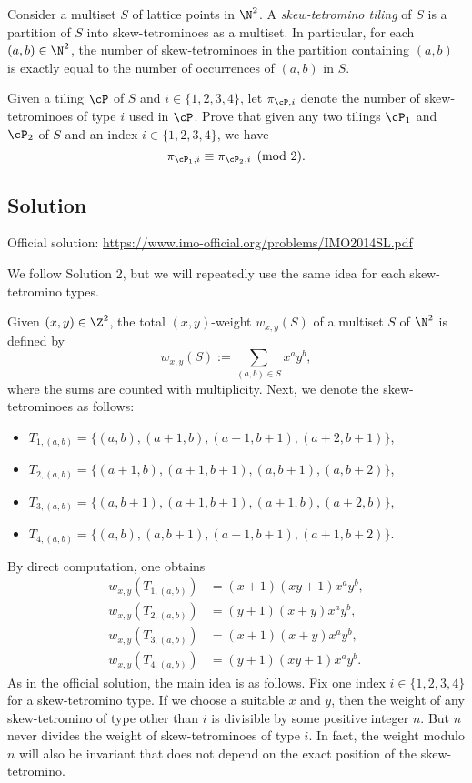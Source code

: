 Consider a multiset $S$ of lattice points in $\N^2$.
A \emph{skew-tetromino tiling} of $S$ is a partition of $S$ into skew-tetrominoes as a multiset.
In particular, for each $(a, b) \in \N^2$, the number of skew-tetrominoes in the partition containing $(a, b)$ is exactly equal to the number of occurrences of $(a, b)$ in $S$.

Given a tiling $\cP$ of $S$ and $i \in \{1, 2, 3, 4\}$, let $\pi_{\cP, i}$ denote the number of skew-tetrominoes of type $i$ used in $\cP$.
Prove that given any two tilings $\cP_1$ and $\cP_2$ of $S$ and an index $i \in \{1, 2, 3, 4\}$, we have
\[ \pi_{\cP_1, i} \equiv \pi_{\cP_2, i} \pmod{2}. \]



\subsection*{Solution}

Official solution: \url{https://www.imo-official.org/problems/IMO2014SL.pdf}

We follow Solution 2, but we will repeatedly use the same idea for each skew-tetromino types.

Given $(x, y) \in \Z^2$, the total $(x, y)$-weight $w_{x, y}(S)$ of a multiset $S$ of $\N^2$ is defined by
\[ w_{x, y}(S) := \sum_{(a, b) \in S} x^a y^b, \]
    where the sums are counted with multiplicity.
Next, we denote the skew-tetrominoes as follows:
\begin{itemize}
    \item   $T_{1, (a, b)} = \{(a, b), (a + 1, b), (a + 1, b + 1), (a + 2, b + 1)\}$,
    \item   $T_{2, (a, b)} = \{(a + 1, b), (a + 1, b + 1), (a, b + 1), (a, b + 2)\}$,
    \item   $T_{3, (a, b)} = \{(a, b + 1), (a + 1, b + 1), (a + 1, b), (a + 2, b)\}$,
    \item   $T_{4, (a, b)} = \{(a, b), (a, b + 1), (a + 1, b + 1), (a + 1, b + 2)\}$.
\end{itemize}

By direct computation, one obtains
\begin{align*}
    w_{x, y}(T_{1, (a, b)}) &= (x + 1)(xy + 1) x^a y^b, \\
    w_{x, y}(T_{2, (a, b)}) &= (y + 1)(x + y) x^a y^b, \\
    w_{x, y}(T_{3, (a, b)}) &= (x + 1)(x + y) x^a y^b, \\
    w_{x, y}(T_{4, (a, b)}) &= (y + 1)(xy + 1) x^a y^b.
\end{align*}
As in the official solution, the main idea is as follows.
Fix one index $i \in \{1, 2, 3, 4\}$ for a skew-tetromino type.
If we choose a suitable $x$ and $y$, then the weight of any skew-tetromino of type other than $i$ is divisible by some positive integer $n$.
But $n$ never divides the weight of skew-tetrominoes of type $i$.
In fact, the weight modulo $n$ will also be invariant that does not depend on the exact position of the skew-tetromino.


